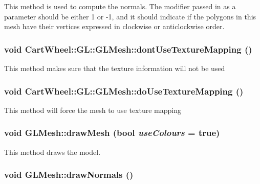 \label{classCartWheel_1_1GL_1_1GLMesh_aba8350867124ed15f083199dbd30e09e}
This method is used to compute the normals. The modifier passed in as a parameter should be either 1 or -\/1, and it should indicate if the polygons in this mesh have their vertices expressed in clockwise or anticlockwise order. \hypertarget{classCartWheel_1_1GL_1_1GLMesh_a7fafa8260c29a717f087c3c3236a187a}{
\subsubsection[{dontUseTextureMapping}]{\setlength{\rightskip}{0pt plus 5cm}void CartWheel::GL::GLMesh::dontUseTextureMapping ()}}
\label{classCartWheel_1_1GL_1_1GLMesh_a7fafa8260c29a717f087c3c3236a187a}
This method makes sure that the texture information will not be used \hypertarget{classCartWheel_1_1GL_1_1GLMesh_a88c6556b7de2237ea47f958c2518e9ef}{
\subsubsection[{doUseTextureMapping}]{\setlength{\rightskip}{0pt plus 5cm}void CartWheel::GL::GLMesh::doUseTextureMapping ()}}
\label{classCartWheel_1_1GL_1_1GLMesh_a88c6556b7de2237ea47f958c2518e9ef}
This method will force the mesh to use texture mapping \hypertarget{classCartWheel_1_1GL_1_1GLMesh_a1ea5895a893f95a5c540b0f63bc8fd8c}{
\subsubsection[{drawMesh}]{\setlength{\rightskip}{0pt plus 5cm}void GLMesh::drawMesh (bool {\em useColours} = {\ttfamily true})}}
\label{classCartWheel_1_1GL_1_1GLMesh_a1ea5895a893f95a5c540b0f63bc8fd8c}
This method draws the model. \hypertarget{classCartWheel_1_1GL_1_1GLMesh_ab2a3b84bab3f14733d68da4df2a25e63}{
\subsubsection[{drawNormals}]{\setlength{\rightskip}{0pt plus 5cm}void GLMesh::drawNormals ()}}
